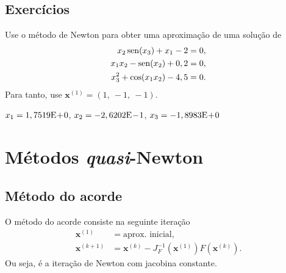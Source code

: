 \subsection*{Exercícios}

\begin{exer}\label{ex:newton_exec}
  Use o método de Newton para obter uma aproximação de uma solução de
  \begin{align}
    x_2\operatorname{sen}(x_3)+x_1-2&=0,\\
    x_1x_2-\operatorname{sen}(x_2)+0,2&=0,\\
    x_3^2+\cos(x_1x_2)-4,5&=0.
  \end{align}
Para tanto, use $\pmb{x}^{(1)} = (1,~-1,~-1)$.
\end{exer}
\begin{resp}
  $x_1 = 1,7519\mathrm{E}\!+\!0$, $x_2 = -2,6202\mathrm{E}\!-\!1$, $x_3 =-1,8983\mathrm{E}\!+\!0$
\end{resp}



\section{Métodos {\it quasi}-Newton}\label{cap_snl_sec_quasi_newton}

\subsection{Método do acorde}

O método do acorde consiste na seguinte iteração
\begin{align}
  \pmb{x}^{(1)} &= \text{aprox. inicial},\\
  \pmb{x}^{(k+1)} &= \pmb{x}^{(k)} - J_F^{-1}(\pmb{x}^{(1)})F(\pmb{x}^{(k)}).
\end{align}
Ou seja, é a iteração de Newton com jacobina constante.

